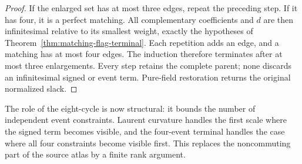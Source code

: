 \begin{proof}
If the enlarged set has at most three edges, repeat the preceding step. If it has four, it is a perfect matching. All complementary coefficients and $d$ are then infinitesimal relative to its smallest weight, exactly the hypotheses of Theorem~\ref{thm:matching-flag-terminal}. Each repetition adds an edge, and a matching has at most four edges. The induction therefore terminates after at most three enlargements. Every step retains the complete parent; none discards an infinitesimal signed or event term. Pure-field restoration returns the original normalized slack.
\end{proof}

The role of the eight-cycle is now structural: it bounds the number of independent event constraints. Laurent curvature handles the first scale where the signed term becomes visible, and the four-event terminal handles the case where all four constraints become visible first. This replaces the noncommuting part of the source atlas by a finite rank argument.
